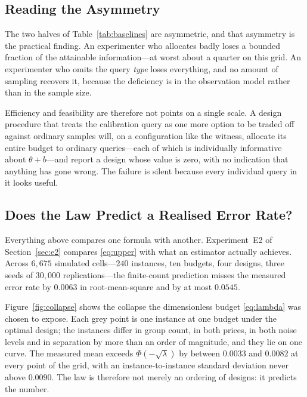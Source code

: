 

\subsection{Reading the Asymmetry}

The two halves of Table~\ref{tab:baselines} are asymmetric, and that asymmetry is the
practical finding. An experimenter who allocates badly loses a bounded fraction of the
attainable information---at worst about a quarter on this grid. An experimenter who omits
the query \emph{type} loses everything, and no amount of sampling recovers it, because the
deficiency is in the observation model rather than in the sample size.

Efficiency and feasibility are therefore not points on a single scale. A design procedure
that treats the calibration query as one more option to be traded off against ordinary
samples will, on a configuration like the witness, allocate its entire budget to ordinary
queries---each of which is individually informative about $\theta+b$---and report a design
whose value is zero, with no indication that anything has gone wrong. The failure is silent
because every individual query in it looks useful.

\subsection{Does the Law Predict a Realised Error Rate?}
\label{sec:e2results}

Everything above compares one formula with another. Experiment~E2 of
Section~\ref{sec:e2} compares \eqref{eq:upper} with what an estimator actually achieves.
Across $6{,}675$ simulated cells---$240$ instances, ten budgets, four designs, three seeds of
$30{,}000$ replications---the finite-count prediction misses the measured error rate by
$0.0063$ in root-mean-square and by at most $0.0545$. \NUM{}

Figure~\ref{fig:collapse} shows the collapse the dimensionless budget \eqref{eq:lambda} was
chosen to expose. Each grey point is one instance at one budget under the optimal design;
the instances differ in group count, in both prices, in both noise levels and in separation
by more than an order of magnitude, and they lie on one curve. The measured mean exceeds
$\Phi(-\sqrt{\lambda})$ by between $0.0033$ and $0.0082$ at every point of the grid, with an
instance-to-instance standard deviation never above $0.0090$. The law is therefore not merely
an ordering of designs: it predicts the number.

